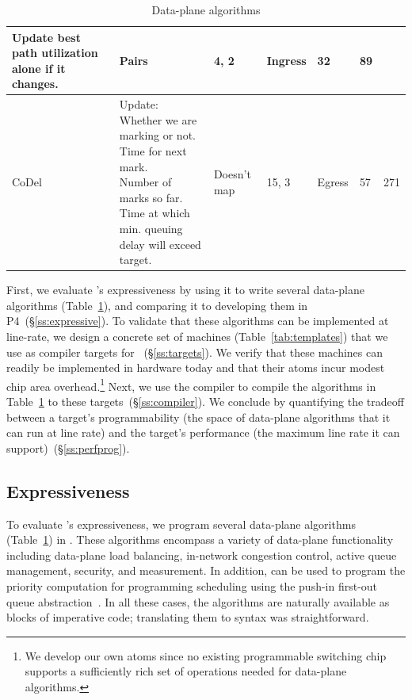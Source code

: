 \begin{table}[!t]
\begin{tabular}{|p{}|p{}|p{}|p{}|p{}|p{}|p{}|}
{                                           Update best path utilization alone if it changes.}  & Pairs & 4, 2 & Ingress & 32 & 89\\
\hline
CoDel~\cite{codel} & \pbox{0.54\textwidth}{Update:\\Whether we are marking or not.\\Time for next mark.\\Number of marks so far.\\Time at which min. queuing delay will exceed target.}& Doesn't map & 15, 3 & Egress & 57 & 271\\
\hline
\end{tabular}
\caption{Data-plane algorithms}
\label{tab:algos}
\end{table}

First, we evaluate \pktlanguage's expressiveness by using it to write several
data-plane algorithms (Table~\ref{tab:algos}), and comparing it to developing
them in P4~(\S\ref{ss:expressive}).  To validate that these algorithms can be
implemented at line-rate, we design a concrete set of \absmachine machines
(Table~\ref{tab:templates}) that we use as compiler targets for
\pktlanguage~(\S\ref{ss:targets}).  We verify that these machines can readily
be implemented in hardware today and that their atoms incur modest chip area
overhead.\footnote{We develop our own atoms since no existing programmable
switching chip supports a sufficiently rich set of operations needed for
data-plane algorithms.} Next, we use the \pktlanguage compiler to compile the
algorithms in Table~\ref{tab:algos} to these targets~(\S\ref{ss:compiler}).  We
conclude by quantifying the tradeoff between a target's programmability (the
space of data-plane algorithms that it can run at line rate) and the target's
performance (the maximum line rate it can support)~(\S\ref{ss:perfprog}).

\subsection{Expressiveness}
\label{ss:expressiveness}

To evaluate \pktlanguage's expressiveness, we program several data-plane
algorithms (Table~\ref{tab:algos}) in \pktlanguage. These algorithms encompass
a variety of data-plane functionality including data-plane load balancing,
in-network congestion control, active queue management, security, and
measurement. In addition, \pktlanguage can be used to program the priority
computation for programming scheduling using the push-in first-out queue
abstraction~\cite{pifo_hotnets}. In all these cases, the algorithms are
naturally available as blocks of imperative code; translating them to
\pktlanguage syntax was straightforward.

